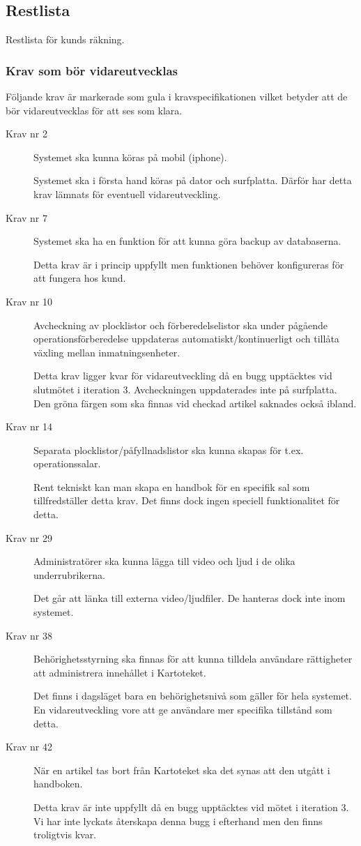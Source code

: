 \documentclass{article}
\begin{document}
\subsection{Restlista}
Restlista för kunds räkning. 
\subsubsection{Krav som bör vidareutvecklas}
Följande krav är markerade som gula i kravspecifikationen vilket betyder att de bör vidareutvecklas för att ses som klara.
\begin{description}
\item[Krav nr 2] Systemet ska kunna köras på mobil (iphone).

Systemet ska i första hand köras på dator och surfplatta. Därför har detta krav lämnats för eventuell vidareutveckling.

\item[Krav nr 7] Systemet ska ha en funktion för att kunna göra backup av databaserna.

Detta krav är i princip uppfyllt men funktionen behöver konfigureras för att fungera hos kund. 
\item[Krav nr 10] Avcheckning av plocklistor och förberedelselistor ska under pågående operationsförberedelse uppdateras automatiskt/kontinuerligt och tillåta växling mellan inmatningsenheter.

Detta krav ligger kvar för vidareutveckling då en bugg upptäcktes vid slutmötet i iteration 3. Avcheckningen uppdaterades inte på surfplatta. Den gröna färgen som ska finnas vid checkad artikel saknades också ibland.
\item[Krav nr 14] Separata plocklistor/påfyllnadslistor ska kunna skapas för t.ex. operationssalar.

Rent tekniskt kan man skapa en handbok för en specifik sal som tillfredställer detta krav. Det finns dock ingen speciell funktionalitet för detta.
\item[Krav nr 29] Administratörer ska kunna lägga till video och ljud i de olika underrubrikerna.

Det går att länka till externa video/ljudfiler. De hanteras dock inte inom systemet. 
\item[Krav nr 38] Behörighetsstyrning ska finnas för att kunna tilldela användare rättigheter att administrera innehållet i Kartoteket.

Det finns i dagsläget bara en behörighetsnivå som gäller för hela systemet. En vidareutveckling vore att ge användare mer specifika tillstånd som detta.
\item[Krav nr 42] När en artikel tas bort från Kartoteket ska det synas att den utgått i handboken.

Detta krav är inte uppfyllt då en bugg upptäcktes vid mötet i iteration 3. Vi har inte lyckats återskapa denna bugg i efterhand men den finns troligtvis kvar. \end{description}
\end{document}
